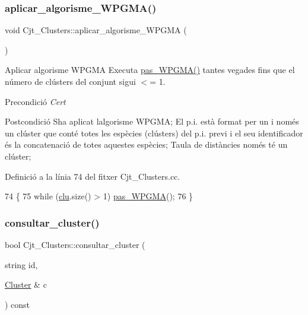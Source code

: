 \subsubsection{\texorpdfstring{aplicar\+\_\+algorisme\+\_\+\+W\+P\+G\+M\+A()}{aplicar\_algorisme\_WPGMA()}}
{\footnotesize\ttfamily void Cjt\+\_\+\+Clusters\+::aplicar\+\_\+algorisme\+\_\+\+W\+P\+G\+MA (\begin{DoxyParamCaption}{ }\end{DoxyParamCaption})}



Aplicar algorisme W\+P\+G\+MA Executa \hyperlink{class_cjt___clusters_a2f8e0a00fc5a706ebdd71dc0c42c5c76}{pas\+\_\+\+W\+P\+G\+M\+A()} tantes vegades fins que el número de clústers del conjunt sigui $<$= 1. 

\begin{DoxyPrecond}{Precondició}
{\itshape Cert} 
\end{DoxyPrecond}
\begin{DoxyPostcond}{Postcondició}
S\textquotesingle{}ha aplicat l\textquotesingle{}algorisme W\+P\+G\+MA; El p.\+i. està format per un i només un clúster que conté totes les espècies (clústers) del p.\+i. previ i el seu identificador és la concatenació de totes aquestes espècies; Taula de distàncies només té un clúster; 
\end{DoxyPostcond}


Definició a la línia 74 del fitxer Cjt\+\_\+\+Clusters.\+cc.


\begin{DoxyCode}
74                                            \{
75     \textcolor{keywordflow}{while} (\hyperlink{class_cjt___clusters_a86fd6089c4e49eaedea86d5ec4ee6495}{clu}.size() > 1) \hyperlink{class_cjt___clusters_a2f8e0a00fc5a706ebdd71dc0c42c5c76}{pas\_WPGMA}();
76 \}
\end{DoxyCode}
\mbox{\label{class_cjt___clusters_a3e0776e946a8363e70d53493b39c09a6}} 
\subsubsection{\texorpdfstring{consultar\+\_\+cluster()}{consultar\_cluster()}}
{\footnotesize\ttfamily bool Cjt\+\_\+\+Clusters\+::consultar\+\_\+cluster (\begin{DoxyParamCaption}\item[{string}]{id,  }\item[{\hyperlink{class_cluster}{Cluster} \&}]{c }\end{DoxyParamCaption}) const}



